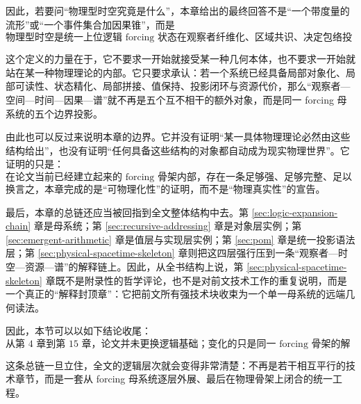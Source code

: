 因此，若要问“物理型时空究竟是什么”，本章给出的最终回答不是“一个带度量的流形”或“一个事件集合加因果锥”，而是
\[
\text{物理型时空是统一上位逻辑 forcing 状态在观察者纤维化、区域共识、决定包络投影、可容许精化、资源长度与闭环谱压缩之下所涌现出的综合结构。}
\]

这个定义的力量在于，它不要求一开始就接受某一种几何本体，也不要求一开始就站在某一种物理理论的内部。它只要求承认：若一个系统已经具备局部对象化、局部可读性、状态精化、局部拼接、值保持、投影闭环与资源代价，那么“观察者—空间—时间—因果—谱”就不再是五个互不相干的额外对象，而是同一 forcing 母系统的五个边界投影。

由此也可以反过来说明本章的边界。它并没有证明“某一具体物理理论必然由这些结构给出”，也没有证明“任何具备这些结构的对象都自动成为现实物理世界”。它证明的只是：
\[
\text{在论文当前已经建立起来的 forcing 骨架内部，存在一条足够强、足够完整、足以被物理化解释的时空骨架链。}
\]
换言之，本章完成的是“可物理化性”的证明，而不是“物理真实性”的宣告。

最后，本章的总链还应当被回指到全文整体结构中去。第 \ref{sec:logic-expansion-chain} 章是母系统；第 \ref{sec:recursive-addressing} 章是对象层实例；第 \ref{sec:emergent-arithmetic} 章是值层与实现层实例；第 \ref{sec:pom} 章是统一投影语法层；第 \ref{sec:physical-spacetime-skeleton} 章则把这四层强行压到一条“观察者—时空—资源—谱”的解释链上。因此，从全书结构上说，第 \ref{sec:physical-spacetime-skeleton} 章既不是附录性的哲学评论，也不是对前文技术工作的重复说明，而是一个真正的“解释封顶章”：它把前文所有强技术块收束为一个单一母系统的远端几何读法。

因此，本节可以以如下结论收尾：
\[
\text{从第 4 章到第 15 章，论文并未更换逻辑基础；变化的只是同一 forcing 骨架的解释层级。第 4 章把它写成上位逻辑，第 7–9 章把它写成对象、值与统一语法的实例，而第 15 章把它最终读成物理型时空骨架。}
\]

这条总链一旦立住，全文的逻辑层次就会变得非常清楚：不再是若干相互平行的技术章节，而是一套从 forcing 母系统逐层外展、最后在物理骨架上闭合的统一工程。
